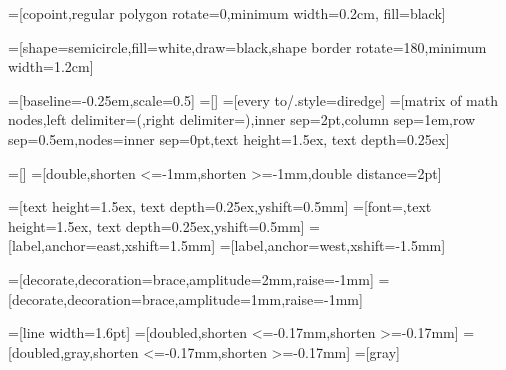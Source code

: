 =[copoint,regular polygon rotate=0,minimum width=0.2cm, fill=black]

=[shape=semicircle,fill=white,draw=black,shape border rotate=180,minimum width=1.2cm]

%
%


=[baseline=-0.25em,scale=0.5]
=[] %
=[every to/.style={diredge}]
=[matrix of math nodes,left delimiter=(,right delimiter=),inner sep=2pt,column sep=1em,row sep=0.5em,nodes={inner sep=0pt},text height=1.5ex, text depth=0.25ex]


=[]
=[double,shorten <=-1mm,shorten >=-1mm,double distance=2pt]

=[text height=1.5ex, text depth=0.25ex,yshift=0.5mm]
=[font=\footnotesize,text height=1.5ex, text depth=0.25ex,yshift=0.5mm]
=[label,anchor=east,xshift=1.5mm]
=[label,anchor=west,xshift=-1.5mm]

\newcommand{\phantombox}[1]{\tikz[baseline=(current bounding box).east]{\path [use as bounding box] (0,0) rectangle #1;}}
=[decorate,decoration={brace,amplitude=2mm,raise=-1mm}]
=[decorate,decoration={brace,amplitude=1mm,raise=-1mm}]

=[line width=1.6pt] %
=[doubled,shorten <=-0.17mm,shorten >=-0.17mm]
=[doubled,gray,shorten <=-0.17mm,shorten >=-0.17mm]
=[gray]%

